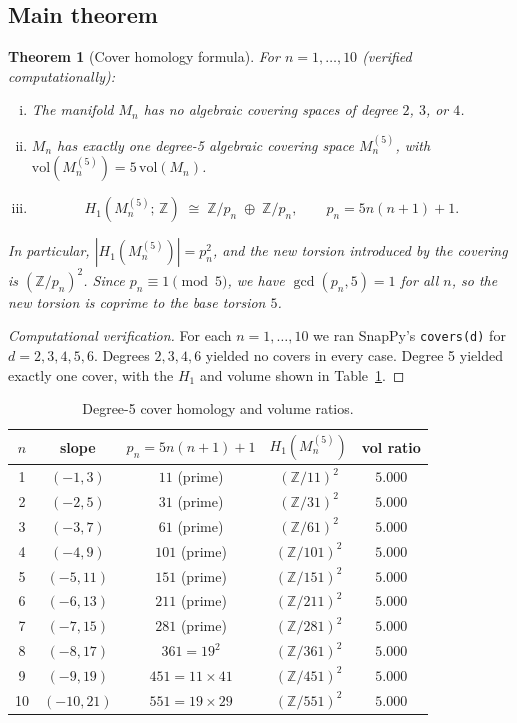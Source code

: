 \documentclass[11pt,a4paper]{article}
\newtheorem{theorem}{Theorem}
\theoremstyle{definition}
\newcommand{\ZZ}{\mathbb{Z}}
\newcommand{\vol}{\mathrm{vol}}
\newcommand{\Mn}{M_n}
\begin{document}
\subsection{Main theorem}

\begin{theorem}[Cover homology formula]
\label{thm:cover}
For $n = 1, \ldots, 10$ (verified computationally):
\begin{enumerate}[(i)]
\item The manifold $\Mn$ has no algebraic covering spaces of
  degree $2$, $3$, or $4$.
\item $\Mn$ has exactly one degree-5 algebraic covering space
  $\Mn^{(5)}$, with $\vol(\Mn^{(5)}) = 5\,\vol(\Mn)$.
\item
  \[
    H_1\!\left(\Mn^{(5)};\,\ZZ\right)
    \;\cong\;
    \ZZ/p_n \;\oplus\; \ZZ/p_n,
    \qquad
    p_n = 5n(n+1)+1.
  \]
\end{enumerate}
In particular, $|H_1(\Mn^{(5)})| = p_n^2$, and the new torsion
introduced by the covering is $(\ZZ/p_n)^2$.
Since $p_n \equiv 1 \pmod{5}$, we have $\gcd(p_n,5)=1$
for all $n$, so the new torsion is coprime to the base torsion $5$.
\end{theorem}

\begin{proof}[Computational verification]
For each $n=1,\ldots,10$ we ran SnapPy's \texttt{covers(d)} for
$d=2,3,4,5,6$.
Degrees $2,3,4,6$ yielded no covers in every case.
Degree 5 yielded exactly one cover, with the $H_1$ and volume shown
in Table~\ref{tab:covers}.
\end{proof}

\begin{table}[htbp]
\centering
\caption{Degree-5 cover homology and volume ratios.}
\label{tab:covers}
\begin{tabular}{ccccc}
\toprule
$n$ & slope & $p_n = 5n(n+1)+1$ & $H_1(M_n^{(5)})$ & vol ratio \\
\midrule
 1 & $(-1,3)$   &  $11$ (prime)    & $(\ZZ/11)^2$  & $5.000$ \\
 2 & $(-2,5)$   &  $31$ (prime)    & $(\ZZ/31)^2$  & $5.000$ \\
 3 & $(-3,7)$   &  $61$ (prime)    & $(\ZZ/61)^2$  & $5.000$ \\
 4 & $(-4,9)$   & $101$ (prime)    & $(\ZZ/101)^2$ & $5.000$ \\
 5 & $(-5,11)$  & $151$ (prime)    & $(\ZZ/151)^2$ & $5.000$ \\
 6 & $(-6,13)$  & $211$ (prime)    & $(\ZZ/211)^2$ & $5.000$ \\
 7 & $(-7,15)$  & $281$ (prime)    & $(\ZZ/281)^2$ & $5.000$ \\
 8 & $(-8,17)$  & $361=19^2$       & $(\ZZ/361)^2$ & $5.000$ \\
 9 & $(-9,19)$  & $451=11\times41$ & $(\ZZ/451)^2$ & $5.000$ \\
10 & $(-10,21)$ & $551=19\times29$ & $(\ZZ/551)^2$ & $5.000$ \\
\bottomrule
\end{tabular}
\end{table}
\end{document}
